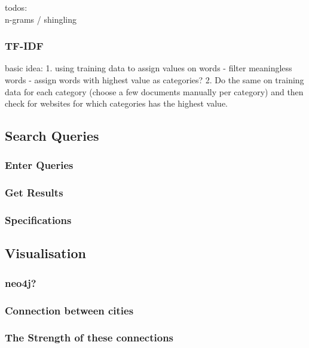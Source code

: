todos: \\
n-grams / shingling\\

\subsubsection{TF-IDF}
basic idea: 1. using training data to assign values on words - filter meaningless words - assign words with highest value as categories? 2. Do the same on training data for each category (choose a few documents manually per category) and then check for websites for which categories has the highest value.

\subsection{Search Queries}

\subsubsection{Enter Queries}
\subsubsection{Get Results}
\subsubsection{Specifications}

\subsection{Visualisation}
\subsubsection{neo4j?}

\subsubsection{Connection between cities}
\subsubsection{The Strength of these connections}